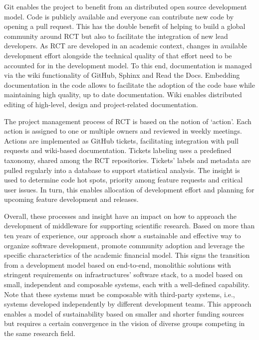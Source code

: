 \documentclass[preprint,12pt, a4paper]{elsarticle}
\begin{document}
Git enables the project to benefit from an distributed open source
development model. Code is publicly available and everyone can contribute new
code by opening a pull request. This has the double benefit of helping to
build a global community around RCT but also to facilitate the integration of
new lead developers. As RCT are developed in an academic context, changes in
available development effort alongside the technical quality of that effort
need to be accounted for in the development model. To this end, documentation
is managed via the wiki functionality of GitHub, Sphinx and Read the Docs.
Embedding documentation in the code allows to facilitate the adoption of the
code base while maintaining high quality, up to date documentation. Wiki
enables distributed editing of high-level, design and project-related
documentation.

The project management process of RCT is based on the notion of `action'.
Each action is assigned to one or multiple owners and reviewed in weekly
meetings. Actions are implemented as GitHub tickets, facilitating integration
with pull requests and wiki-based documentation. Tickets labeling uses a
predefined taxonomy, shared among the RCT repositories. Tickets' labels and
metadata are pulled regularly into a database to support statistical
analysis. The insight is used to determine code hot spots, priority among
feature requests and critical user issues. In turn, this enables allocation
of development effort and planning for upcoming feature development and
releases.

Overall, these processes and insight have an impact on how to approach the
development of middleware for supporting scientific research. Based on more
than ten years of experience, our approach show a sustainable and effective
way to organize software development, promote community adoption and leverage
the specific characteristics of the academic financial model. This signs the
transition from a development model based on end-to-end, monolithic solutions
with stringent requirements on infrastructures' software stack, to a model
based on small, independent and composable systems, each with a well-defined
capability. Note that these systems must be composable with third-party
systems, i.e., systems developed independently by different development
teams. This approach enables a model of sustainability based on smaller and
shorter funding sources but requires a certain convergence in the vision of
diverse groups competing in the same research field.

\end{document}
